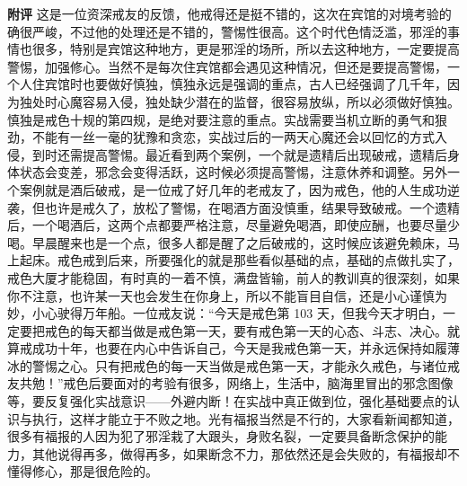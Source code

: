 \begin{case}
    \textbf{附评} 这是一位资深戒友的反馈，他戒得还是挺不错的，这次在宾馆的对境考验的确很严峻，不过他的处理还是不错的，警惕性很高。这个时代色情泛滥，邪淫的事情也很多，特别是宾馆这种地方，更是邪淫的场所，所以去这种地方，一定要提高警惕，加强修心。当然不是每次住宾馆都会遇见这种情况，但还是要提高警惕，一个人住宾馆时也要做好慎独，慎独永远是强调的重点，古人已经强调了几千年，因为独处时心魔容易入侵，独处缺少潜在的监督，很容易放纵，所以必须做好慎独。慎独是戒色十规的第四规，是绝对要注意的重点。实战需要当机立断的勇气和狠劲，不能有一丝一毫的犹豫和贪恋，实战过后的一两天心魔还会以回忆的方式入侵，到时还需提高警惕。最近看到两个案例，一个就是遗精后出现破戒，遗精后身体状态会变差，邪念会变得活跃，这时候必须提高警惕，注意休养和调整。另外一个案例就是酒后破戒，是一位戒了好几年的老戒友了，因为戒色，他的人生成功逆袭，但也许是戒久了，放松了警惕，在喝酒方面没慎重，结果导致破戒。一个遗精后，一个喝酒后，这两个点都要严格注意，尽量避免喝酒，即使应酬，也要尽量少喝。早晨醒来也是一个点，很多人都是醒了之后破戒的，这时候应该避免赖床，马上起床。戒色戒到后来，所要强化的就是那些看似基础的点，基础的点做扎实了，戒色大厦才能稳固，有时真的一着不慎，满盘皆输，前人的教训真的很深刻，如果你不注意，也许某一天也会发生在你身上，所以不能盲目自信，还是小心谨慎为妙，小心驶得万年船。一位戒友说：“今天是戒色第 103 天，但我今天才明白，一定要把戒色的每天都当做是戒色第一天，要有戒色第一天的心态、斗志、决心。就算戒成功十年，也要在内心中告诉自己，今天是我戒色第一天，并永远保持如履薄冰的警惕之心。只有把戒色的每一天当做是戒色第一天，才能永久戒色，与诸位戒友共勉！”戒色后要面对的考验有很多，网络上，生活中，脑海里冒出的邪念图像等，要反复强化实战意识——外避内断！在实战中真正做到位，强化基础要点的认识与执行，这样才能立于不败之地。光有福报当然是不行的，大家看新闻都知道，很多有福报的人因为犯了邪淫栽了大跟头，身败名裂，一定要具备断念保护的能力，其他说得再多，做得再多，如果断念不力，那依然还是会失败的，有福报却不懂得修心，那是很危险的。
\end{case}

